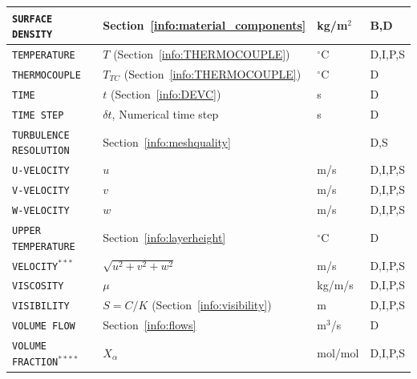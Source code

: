 \documentclass[11pt]{book}
\newcommand{\ct}{\tt\small}
\begin{document}
\begin{longtable}{@{\extracolsep{\fill}}|l|l|l|l|}
{\ct SURFACE DENSITY}                           & Section~\ref{info:material_components}        & kg/m$^2$       & B,D          \\ \hline
{\ct TEMPERATURE}                               & $T$ (Section~\ref{info:THERMOCOUPLE})         & $^\circ$C      & D,I,P,S      \\ \hline
{\ct THERMOCOUPLE}                              & $T_{TC}$ (Section~\ref{info:THERMOCOUPLE})    & $^\circ$C      & D            \\ \hline
{\ct TIME}                                      & $t$ (Section~\ref{info:DEVC})                 & s              & D            \\ \hline
{\ct TIME STEP}                                 & $\delta t$, Numerical time step               & s              & D            \\ \hline
{\ct TURBULENCE RESOLUTION}                     & Section~\ref{info:meshquality}                &                & D,S          \\ \hline
{\ct U-VELOCITY}                                & $u$                                           & m/s            & D,I,P,S      \\ \hline
{\ct V-VELOCITY}                                & $v$                                           & m/s            & D,I,P,S      \\ \hline
{\ct W-VELOCITY}                                & $w$                                           & m/s            & D,I,P,S      \\ \hline
{\ct UPPER TEMPERATURE}                         & Section~\ref{info:layerheight}                & $^\circ$C      & D            \\ \hline
{\ct VELOCITY}$^{***}$                          & $\sqrt{u^2+v^2+w^2}$                          & m/s            & D,I,P,S      \\ \hline
{\ct VISCOSITY}                                 & $\mu$                                         & kg/m/s         & D,I,P,S      \\ \hline
{\ct VISIBILITY}                                & $S=C/K$ (Section~\ref{info:visibility})       & m              & D,I,P,S      \\ \hline
{\ct VOLUME FLOW}                               & Section~\ref{info:flows}                      & m$^3$/s        & D            \\ \hline
{\ct VOLUME FRACTION}$^{****}$                  & $X_\alpha$                                    & mol/mol        & D,I,P,S      \\ \hline

\end{longtable}
\end{document}

